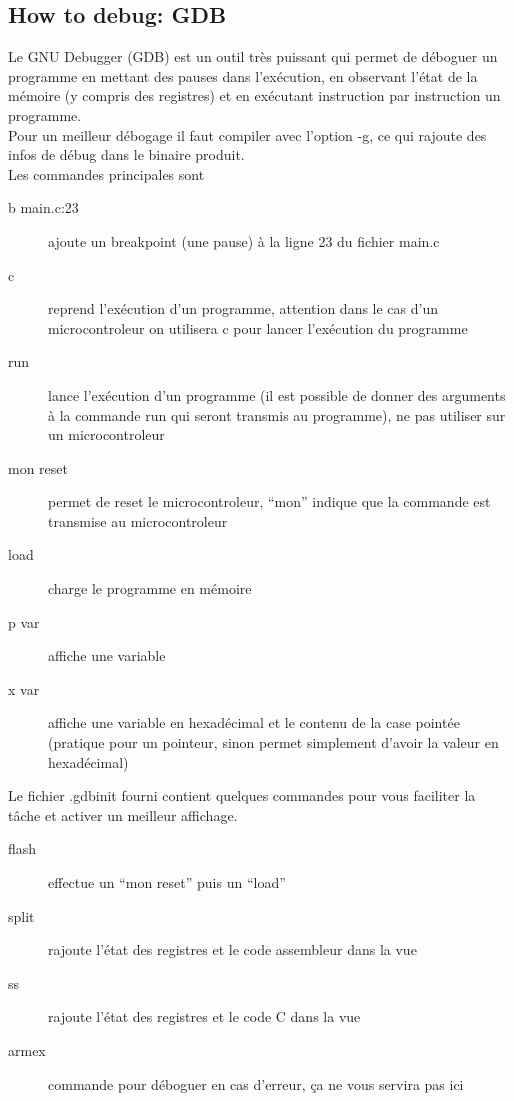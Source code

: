 \documentclass[a4paper,10pt]{article} %
\begin{document}
\subsection{\label{gdb}How to debug: GDB}
Le GNU Debugger (GDB) est un outil très puissant qui permet de déboguer un programme en mettant des pauses dans l’exécution, en observant l'état de la mémoire (y compris des registres) et en exécutant instruction par instruction un programme.\\

Pour un meilleur débogage il faut compiler avec l'option -g, ce qui rajoute des infos de débug dans le binaire produit.\\

Les commandes principales sont
\begin{description}
    \item[b main.c:23] ajoute un breakpoint (une pause) à la ligne 23 du fichier main.c
    \item[c] reprend l’exécution d'un programme, attention dans le cas d'un microcontroleur on utilisera c pour lancer l’exécution du programme
    \item[run] lance l’exécution d'un programme (il est possible de donner des arguments à la commande run qui seront transmis au programme), ne pas utiliser sur un microcontroleur
    \item[mon reset] permet de reset le microcontroleur, ``mon'' indique que la commande est transmise au microcontroleur
    \item[load] charge le programme en mémoire
    \item[p var] affiche une variable
    \item[x var] affiche une variable en hexadécimal et le contenu de la case pointée (pratique pour un pointeur, sinon permet simplement d'avoir la valeur en hexadécimal)
\end{description}

\bigskip
Le fichier .gdbinit fourni contient quelques commandes pour vous faciliter la tâche et activer un meilleur affichage.

\begin{description}
    \item[flash] effectue un ``mon reset'' puis un ``load''
    \item[split] rajoute l'état des registres et le code assembleur dans la vue
    \item[ss] rajoute l'état des registres et le code C dans la vue
    \item[armex] commande pour déboguer en cas d'erreur, ça ne vous servira pas ici
\end{description}
\end{document}

